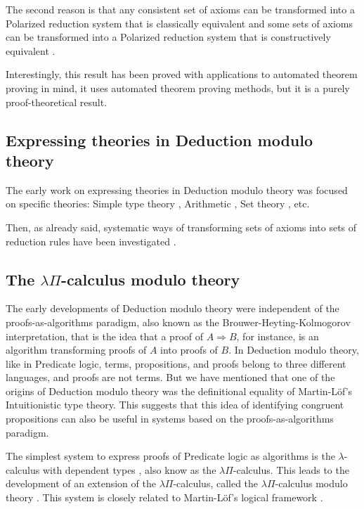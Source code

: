 \documentclass{llncs}
\begin{document}
The second reason is that any consistent set of axioms can be transformed 
into a Polarized reduction system that is classically equivalent 
\cite{stacs,Burel} and some sets of axioms can be transformed into 
a Polarized reduction system that is constructively equivalent 
\cite{Burel9}.

Interestingly, this result has been proved with applications
to automated theorem proving in mind, it uses automated theorem proving 
methods, but it is a purely proof-theoretical result.

\subsection{Expressing theories in Deduction modulo theory}

The early work on expressing theories in Deduction modulo theory 
was focused on specific theories: Simple type theory \cite{DHKHOL}, 
Arithmetic \cite{Peano,Allali}, Set theory \cite{DowekMiquel}, etc.

Then, as already said, systematic ways of transforming sets of axioms
into sets of reduction rules have been investigated
\cite{stacs,Burel,Burel9}.

\subsection{The $\lambda \Pi$-calculus modulo theory}

The early developments of Deduction modulo theory were 
independent of the proofs-as-algorithms paradigm, also 
known as the Brouwer-Heyting-Kolmogorov interpretation, that is the idea 
that a proof of $A \Rightarrow B$, for instance, is an algorithm transforming 
proofs of $A$ into proofs of $B$.
In Deduction modulo
theory, like in Predicate logic, 
terms, propositions, and proofs belong to three different
languages, and proofs are not terms. But we have mentioned that one
of the origins of Deduction modulo theory was the definitional equality of
Martin-L\"of's Intuitionistic type theory. This suggests that this
idea of identifying congruent propositions can also be useful in
systems based on the proofs-as-algorithms paradigm.

The simplest system to express proofs of Predicate logic as algorithms is the
$\lambda$-calculus with dependent types \cite{HHP}, also know as the $\lambda
\Pi$-calculus. This leads to the development of an extension of the
$\lambda \Pi$-calculus, called the $\lambda \Pi$-calculus modulo
theory \cite{CousineauDowek}. This system is closely related to 
Martin-L\"of's logical framework \cite{NPS}. 
\end{document}
